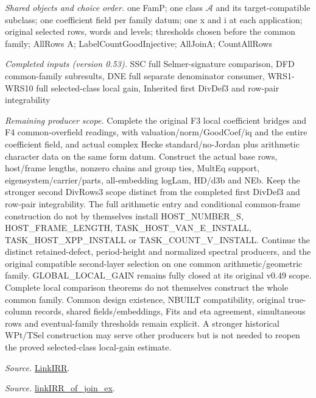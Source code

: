 \documentclass[11pt,a4paper]{article}
\numberwithin{equation}{section}
\theoremstyle{remark}\newtheorem{remark}[theorem]{Remark}
\begin{document}
\emph{Shared objects and choice order.} one FamP; one class $\mathcal A$ and its target-compatible subclass; one coefficient field per family datum; one x and i at each application; original selected rows, words and levels; thresholds chosen before the common family; AllRows A; LabelCountGoodInjective; AllJoinA; CountAllRows

\emph{Completed inputs (version 0.53).} SSC full Selmer-signature comparison, DFD common-family subresults, DNE full separate denominator consumer, WRS1-WRS10 full selected-class local gain, Inherited first DivDef3 and row-pair integrability

\emph{Remaining producer scope.} Complete the original F3 local coefficient bridges and F4 common-overfield readings, with valuation/norm/GoodCoef/iq and the entire coefficient field, and actual complex Hecke standard/no-Jordan plus arithmetic character data on the same form datum. Construct the actual base rows, host/frame lengths, nonzero chains and group ties, MultEq support, eigensystem/carrier/parts, all-embedding logLam, HD/d3b and NEb. Keep the stronger second DivRows3 scope distinct from the completed first DivDef3 and row-pair integrability. The full arithmetic entry and conditional common-frame construction do not by themselves install HOST\_\allowbreak NUMBER\_\allowbreak S, HOST\_\allowbreak FRAME\_\allowbreak LENGTH, TASK\_\allowbreak HOST\_\allowbreak VAN\_\allowbreak E\_\allowbreak INSTALL, TASK\_\allowbreak HOST\_\allowbreak XPP\_\allowbreak INSTALL or TASK\_\allowbreak COUNT\_\allowbreak V\_\allowbreak INSTALL. Continue the distinct retained-defect, period-height and normalized spectral producers, and the original compatible second-layer selection on one common arithmetic/geometric family. GLOBAL\_\allowbreak LOCAL\_\allowbreak GAIN remains fully closed at its original v0.49 scope. Complete local comparison theorems do not themselves construct the whole common family. Common design existence, NBUILT compatibility, original true-column records, shared fields/embeddings, Fits and eta agreement, simultaneous rows and eventual-family thresholds remain explicit. A stronger historical WPt/TSel construction may serve other producers but is not needed to reopen the proved selected-class local-gain estimate.

\emph{Source.} \href{https://github.com/CocoSgt/riemann-hypothesis-lean/blob/7cbf7a0c32fca1badf05931879a37c3f8a2b03b4/src/Formalism/SharpRestriction/GlobalTheoremInputs.lean#L55-L58}{LinkIRR}.

\emph{Source.} \href{https://github.com/CocoSgt/riemann-hypothesis-lean/blob/7cbf7a0c32fca1badf05931879a37c3f8a2b03b4/src/Development/AbelianVarietyTheory/Proofs/GlobalInterpolation/LinkIRROfJoinEx.lean#L17-L38}{linkIRR\_\allowbreak of\_\allowbreak join\_\allowbreak ex}.
\end{document}
